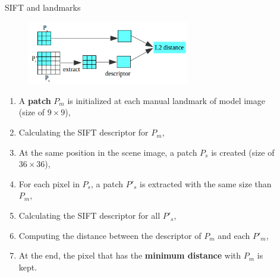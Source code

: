 \documentclass{LaBRI_poster}
\begin{document}
\begin{frame}[t]
\begin{columns}[t]
\begin{column}{\twocolwidth}
\vspace{5pt}

\begin{block}{SIFT and landmarks}
\begin{figure}
    	 \centering
    	 \includegraphics[width=0.7\textwidth]{images/illustration}
    \end{figure}
    \begin{enumerate}
    		\item A \textbf{patch} $P_m$ is initialized at each manual landmark of model image (size of $9\times9$),
    		\item Calculating the SIFT descriptor for $P_m$,
    		\item At the same position in the scene image, a patch $P_s$ is created (size of $36\times36$),
    		\item For each pixel in $P_s$, a patch $P'_s$ is extracted with the same size than $P_m$,
    		\item Calculating the SIFT descriptor for all $P'_s$,
    		\item Computing the distance between the descriptor of $P_m$ and each $P'_m$,
    		\item At the end, the pixel that has the \textbf{minimum distance} with $P_m$ is kept.
    \end{enumerate}
\end{block}

\end{column}

\begin{column}{\sepwidth}\end{column}

\begin{column}{\twocolwidth}



\end{column}
\end{columns}
\end{frame}
\end{document}
